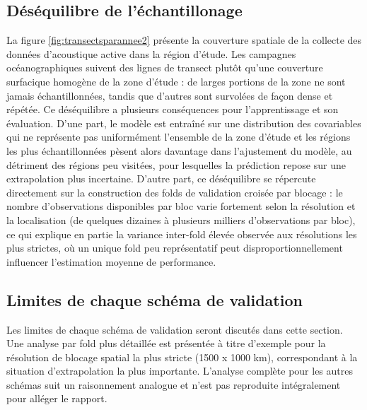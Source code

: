 \documentclass[11pt,a4paper,oneside]{report}
\begin{document}
	\subsection{Déséquilibre de l'échantillonage}
	\label{discussion:echantillonage}
	La figure \ref{fig:transectsparannee2} présente la couverture spatiale de la collecte des données d'acoustique active dans la région d'étude. Les campagnes océanographiques suivent des lignes de transect plutôt qu'une couverture surfacique homogène de la zone d'étude : de larges portions de la zone ne sont jamais échantillonnées, tandis que d'autres sont survolées de façon dense et répétée. Ce déséquilibre a plusieurs conséquences pour l'apprentissage et son évaluation. D'une part, le modèle est entraîné sur une distribution des covariables qui ne représente pas uniformément l'ensemble de la zone d'étude et les régions les plus échantillonnées pèsent alors davantage dans l'ajustement du modèle, au détriment des régions peu visitées, pour lesquelles la prédiction repose sur une extrapolation plus incertaine. D'autre part, ce déséquilibre se répercute directement sur la construction des folds de validation croisée par blocage : le nombre d'observations disponibles par bloc varie fortement selon la résolution et la localisation (de quelques dizaines à plusieurs milliers d'observations par bloc), ce qui explique en partie la variance inter-fold élevée observée aux résolutions les plus strictes, où un unique fold peu représentatif peut disproportionnellement influencer l'estimation moyenne de performance.
	
	\subsection{Limites de chaque schéma de validation}
	Les limites de chaque schéma de validation seront discutés dans cette section. Une analyse par fold plus détaillée est présentée à titre d'exemple pour la résolution de blocage spatial la plus stricte (1500 x 1000 km), correspondant à la situation d'extrapolation la plus importante. L'analyse complète pour les autres schémas suit un raisonnement analogue et n'est pas reproduite intégralement pour alléger le rapport.
	
	\label{discussion:par_cv}
\end{document}
